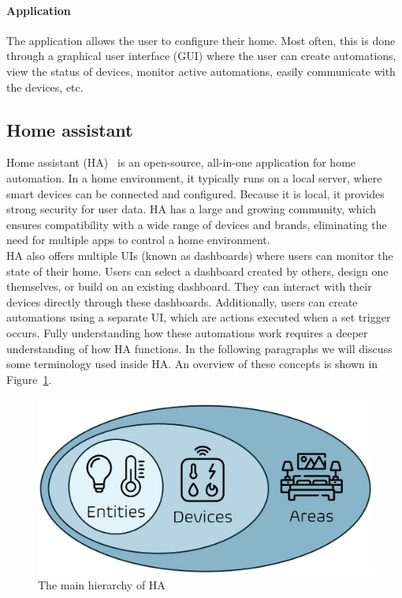 \documentclass[11pt,a4paper]{report}
\begin{document}
\paragraph{Application}
The application allows the user to configure their home. Most often, this is done through a graphical user interface (GUI) where the user can create automations, view the status of devices, monitor active automations, easily communicate with the devices, etc.

\subsection{Home assistant}
\label{HomeAssistant}

Home assistant (HA)~\cite{HA} is an open-source, all-in-one application for home automation. In a home environment, it typically  runs on a local server, where smart devices can be connected and configured. Because it is local, it provides strong security for user data. HA has a large and growing community, which ensures compatibility with a wide range of devices and brands, eliminating the need for multiple apps to control a home environment.\\
HA also offers multiple UIs (known as dashboards) where users can monitor the state of their home. Users can select a dashboard created by others, design one themselves, or build on an existing dashboard. They can interact with their devices directly through these dashboards. Additionally, users can create automations using a separate UI, which are actions executed when a set trigger occurs. Fully understanding how these automations work requires a deeper understanding of how HA functions.
In the following paragraphs we will discuss some terminology used inside HA. 
An overview of these concepts is shown in Figure~\ref{fig:ha_structure}.

\begin{figure}
    \centering
    \includegraphics[width=0.8\linewidth]{images/HA_structure.png}
    \caption{The main hierarchy of HA \protect\footnotemark}
    \label{fig:ha_structure}
\end{figure}
\end{document}
